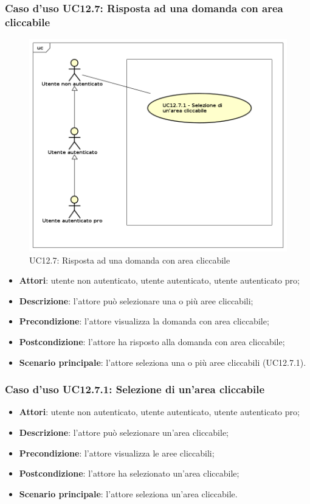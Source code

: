 \subsubsection{Caso d'uso UC12.7: Risposta ad una domanda con area cliccabile}
\label{UC12.7}
\begin{figure}[h]
	\centering
	\includegraphics[scale=0.5]{UML/UC12_7.png}
	\caption{UC12.7: Risposta ad una domanda con area cliccabile}
\end{figure}
\begin{itemize}
\item \textbf{Attori}: utente non autenticato, utente autenticato, utente autenticato pro;
\item \textbf{Descrizione}: l'attore può selezionare una o più aree cliccabili;
\item \textbf{Precondizione}: l'attore visualizza la domanda con area cliccabile;
\item \textbf{Postcondizione}: l'attore ha risposto alla domanda con area cliccabile;
\item \textbf{Scenario principale}: l'attore seleziona una o più aree cliccabili (UC12.7.1).
\end{itemize}

\subsubsection{Caso d'uso UC12.7.1: Selezione di un'area cliccabile}
\begin{itemize}
\item \textbf{Attori}: utente non autenticato, utente autenticato, utente autenticato pro;
\item \textbf{Descrizione}: l'attore può selezionare un'area cliccabile;
\item \textbf{Precondizione}: l'attore visualizza le aree cliccabili;
\item \textbf{Postcondizione}: l'attore ha selezionato un'area cliccabile;
\item \textbf{Scenario principale}: l'attore seleziona un'area cliccabile.
\end{itemize}